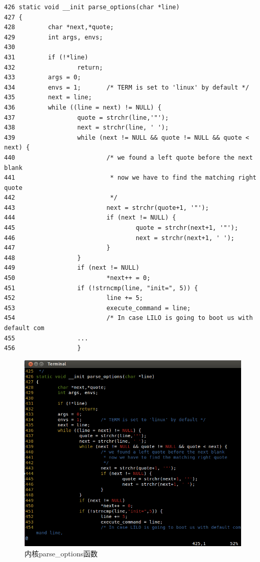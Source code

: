 {\begin{shaded}\begin{verbatim}
426 static void __init parse_options(char *line)
427 {
428         char *next,*quote;
429         int args, envs;
430 
431         if (!*line)
432                 return;
433         args = 0;
434         envs = 1;       /* TERM is set to 'linux' by default */
435         next = line;
436         while ((line = next) != NULL) {
437                 quote = strchr(line,'"');
438                 next = strchr(line, ' ');
439                 while (next != NULL && quote != NULL && quote < next) {
440                         /* we found a left quote before the next blank
441                          * now we have to find the matching right quote
442                          */
443                         next = strchr(quote+1, '"');
444                         if (next != NULL) {
445                                 quote = strchr(next+1, '"');
446                                 next = strchr(next+1, ' ');
447                         }
448                 }
449                 if (next != NULL)
450                         *next++ = 0;
451                 if (!strncmp(line, "init=", 5)) {
452                         line += 5;
453                         execute_command = line;
454                         /* In case LILO is going to boot us with default com
455                 ...
456                 }
\end{verbatim}\end{shaded}}
\begin{figure}[htbp]
\centering
\includegraphics{./pictures/parse_options.png}
\caption{内核parse\_options函数}
\end{figure}

